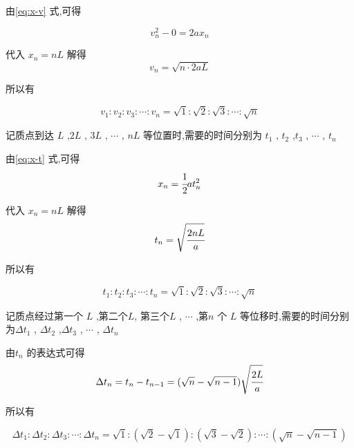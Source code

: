 由\eqref{eq:x-v} 式,可得

\[v_n^2-0=2ax_n\]

代入 $x_n=nL$ 解得
\[
  v_n=\sqrt{n\cdot 2aL}
\]

所以有

\begin{equation}
  v_1 : v_2 : v_3 : \cdots : v_n =\sqrt{1} : \sqrt{2} :\sqrt{3} :\cdots :\sqrt{n} 
  \label{eq:v-x-frac}
\end{equation}

记质点到达 $L$ ,$2L$ , $3L$ , $\cdots $ , $nL$ 等位置时,需要的时间分别为 $t_1$ , $t_2$ ,$t_3$ , $\cdots$ , $t_n$ 

由\eqref{eq:x-t} 式,可得
\[x_n=\cfrac{1}{2}at_n^2\]

代入 $x_n=nL$ 解得
\[
  t_n=\sqrt{\cfrac{2nL}{a}}
\]

所以有

\begin{equation}
  t_1 : t_2 : t_3 : \cdots : t_n =\sqrt{1} : \sqrt{2} :\sqrt{3} :\cdots :\sqrt{n} 
  \label{eq:t-x-frac}
\end{equation}

记质点经过第一个 $L$ ,第二个$L$, 第三个$ L$ , $\cdots$ ,第$n$ 个 $L$ 等位移时,需要的时间分别为$\Delta t_1$ , $\Delta t_2$ ,$\Delta t_3$ , $\cdots$ , $\Delta t_n$ 

由$t_n$ 的表达式可得
\[
  \Delta t_n = t_n - t_{n-1}=(\sqrt{n}-\sqrt{n-1})\sqrt{\cfrac{2L}{a}}
\]

所以有

\begin{equation}
  \Delta t_1 : \Delta t_2 : \Delta t_3 : \cdots : \Delta t_n =\sqrt{1} : (\sqrt{2}-\sqrt{1}) :(\sqrt{3}-\sqrt{2}) :\cdots :(\sqrt{n}-\sqrt{n-1} )
  \label{eq:Delta t-x-frac}
\end{equation}
